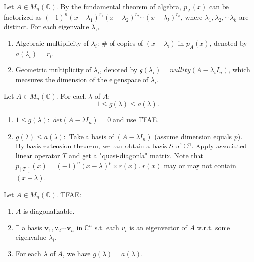 \documentclass[12pt]{article}
\begin{document}
\begin{definition}
    Let $A \in M_n(\mathbb{C})$. By the fundamental theorem of algebra,
    $p_A(x)$ can be factorized as $(-1)^n(x-\lambda_1)^{r_1}(x-\lambda_2)^{r_2}\cdots(x-\lambda_k)^{r_k}$,
    where $\lambda_1,\lambda_2,\cdots\lambda_k$ are distinct. For each eigenvalue $\lambda_i$,
    \begin{enumerate}
        \item Algebraic multiplicity of $\lambda_i$: \# of copies of $(x-\lambda_i)$ in $p_A(x)$, denoted by $a(\lambda_i)=r_i$.
        \item Geometric multiplicity of $\lambda_i$, denoted by $g(\lambda_i)=nullity(A-\lambda_i I_n)$, which measures the dimension of the eigenspace of $\lambda_i$.
    \end{enumerate}
\end{definition}


\begin{theorem}
    Let $A \in M_n(\mathbb{C})$. For each $\lambda$ of $A$:
    \[1\leq g(\lambda)\leq a(\lambda).\]
\end{theorem}

\begin{pfbox}
    \begin{enumerate}
        \item $1\leq g(\lambda):$ $det(A-\lambda I_n)=0$ and use TFAE.
        \item $g(\lambda)\leq a(\lambda):$ Take a basis of $(A-\lambda I_n)$ (assume dimension equals $p$). By basis extension theorem, we can obtain a basis $S$ of $\mathbb{C}^n$. 
        Apply associated linear operator $T$ and get a "quasi-diagonla" matrix. Note that $p_{[T]^{S}_{S}}(x)=(-1)^n(x-\lambda)^p\times r(x)$. $r(x)$ may or may not contain $(x-\lambda)$.
    \end{enumerate}
\end{pfbox}


\begin{theorem}
Let $A\in M_n(\mathbb{C})$. TFAE:
\begin{enumerate}
    \item $A$ is diagonalizable.
    \item $\exists$ a basis ${\mathbf{v}_1,\mathbf{v}_2\cdots\mathbf{v}_n}$ in $\mathbb{C}^n$ s.t. each $v_i$ is an eigenvector of $A$ w.r.t. some eigenvalue $\lambda_i$.
    \item For each $\lambda$ of $A$, we have $g(\lambda)=a(\lambda)$.
\end{enumerate}
\end{theorem}
\end{document}

